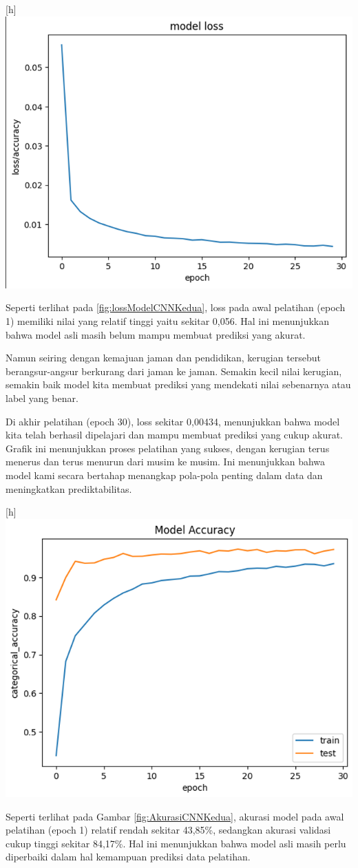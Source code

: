 \begin{center}[h]
	\includegraphics[width=0.7\linewidth]{gambar/bener/Loss_ModelCNN2.png}
	\label{fig:lossModelCNNKedua}
\end{center}
Seperti terlihat pada \ref{fig:lossModelCNNKedua}, loss pada awal pelatihan (epoch 1) memiliki nilai yang relatif tinggi yaitu sekitar 0,056. Hal ini menunjukkan bahwa model asli masih belum mampu membuat prediksi yang akurat.

Namun seiring dengan kemajuan jaman dan pendidikan, kerugian tersebut berangsur-angsur berkurang dari jaman ke jaman. Semakin kecil nilai kerugian, semakin baik model kita membuat prediksi yang mendekati nilai sebenarnya atau label yang benar.

Di akhir pelatihan (epoch 30), loss sekitar 0,00434, menunjukkan bahwa model kita telah berhasil dipelajari dan mampu membuat prediksi yang cukup akurat. Grafik ini menunjukkan proses pelatihan yang sukses, dengan kerugian terus menerus dan terus menurun dari musim ke musim. Ini menunjukkan bahwa model kami secara bertahap menangkap pola-pola penting dalam data dan meningkatkan prediktabilitas. 

\begin{center}[h]
	\includegraphics[width=0.7\linewidth]{gambar/bener/Accuracy_ModelCNN2.png}
	\label{fig:AkurasiCNNKedua}
\end{center}
Seperti terlihat pada Gambar \ref{fig:AkurasiCNNKedua}, akurasi model pada awal pelatihan (epoch 1) relatif rendah sekitar 43,85\%, sedangkan akurasi validasi cukup tinggi sekitar 84,17\%. Hal ini menunjukkan bahwa model asli masih perlu diperbaiki dalam hal kemampuan prediksi data pelatihan.

